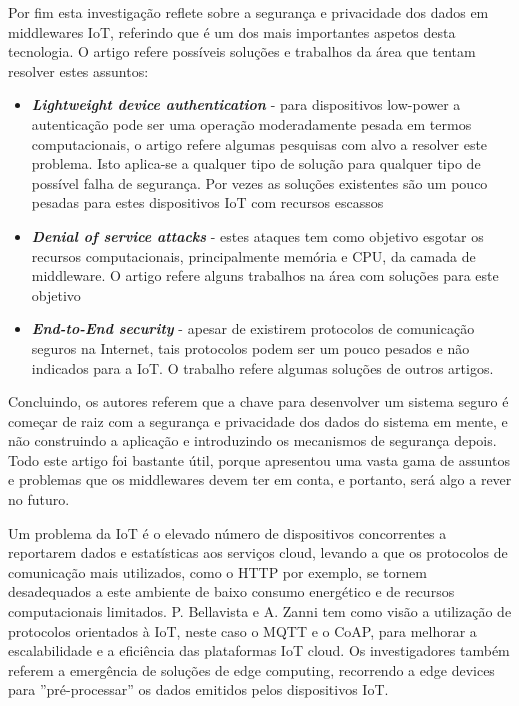 Por fim esta investigação reflete sobre a segurança e privacidade dos dados em middlewares IoT, referindo que é um dos mais importantes aspetos desta tecnologia. O artigo refere possíveis soluções e trabalhos da área que tentam resolver estes assuntos:
\begin{itemize}
\item \textbf{\textit{Lightweight device authentication}} - para dispositivos low-power a autenticação pode ser uma operação moderadamente pesada em termos computacionais, o artigo refere algumas pesquisas com alvo a resolver este problema. Isto aplica-se a qualquer tipo de solução para qualquer tipo de possível falha de segurança. Por vezes as soluções existentes são um pouco pesadas para estes dispositivos IoT com recursos escassos

\item \textbf{\textit{Denial of service attacks}} - estes ataques tem como objetivo esgotar os recursos computacionais, principalmente memória e CPU, da camada de middleware. O artigo refere alguns trabalhos na área com soluções para este objetivo

\item \textbf{\textit{End-to-End security}} - apesar de existirem protocolos de comunicação seguros na Internet, tais protocolos podem ser um pouco pesados e não indicados para a IoT. O trabalho refere algumas soluções de outros artigos.
\end{itemize}

Concluindo, os autores referem que a chave para desenvolver um sistema seguro é começar de raiz com a segurança e privacidade dos dados do sistema em mente, e não construindo a aplicação e introduzindo os mecanismos de segurança depois. Todo este artigo foi bastante útil, porque apresentou uma vasta gama de assuntos e problemas que os middlewares devem ter em conta, e portanto, será algo a rever no futuro.

Um problema da IoT é o elevado número de dispositivos concorrentes a reportarem dados e estatísticas aos serviços cloud, levando a que os protocolos de comunicação mais utilizados, como o HTTP por exemplo, se tornem desadequados a este ambiente de baixo consumo energético e de recursos computacionais limitados. P. Bellavista e A. Zanni \cite{iot-mqtt-coap} tem como visão a utilização de protocolos orientados à IoT, neste caso o MQTT e o CoAP, para melhorar a escalabilidade e a eficiência das plataformas IoT cloud. Os investigadores também referem a emergência de soluções de edge computing, recorrendo a edge devices para ''pré-processar'' os dados emitidos pelos dispositivos IoT.

